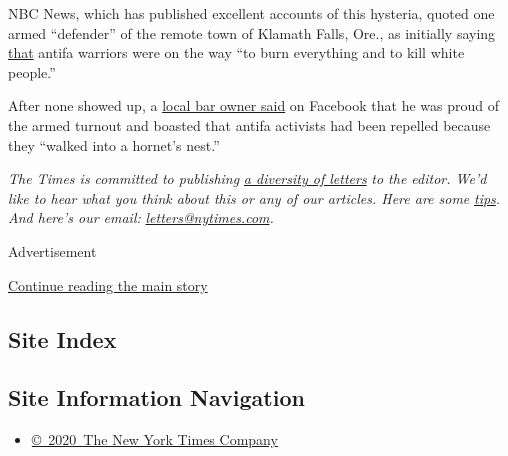 NBC News, which has published excellent accounts of this hysteria,
quoted one armed ``defender'' of the remote town of Klamath Falls, Ore.,
as initially saying
\href{https://www.nbcnews.com/tech/social-media/klamath-falls-oregon-victory-declared-over-antifa-which-never-showed-n1226681}{that}
antifa warriors were on the way ``to burn everything and to kill white
people.''

After none showed up, a
\href{https://www.facebook.com/BlackDogBilliards/posts/3317601008272149?__xts__\%5B0\%5D=68.ARBOw_sLf2jlK3QcCTbMRjrsJTqAsMSxNx2UukVmY45LyqrCuy-X0T0tuAzWSsdnOV4Gl-MnNgR0ecKIxudwgMoBoWWK47arRAtPcgWHMn4AcQPinPKrffW9bsP1FjDhSKqxq01XlrNi3GZxB4SAma4RZkpO3IFOD4MOetuQwe_zJmMJD6Q0G_gmG-4Vd5bRO-AeCt3lRIor1AxDVPKi8ZIkkDH6Px036y_wjw24tJ3p3GrWniT4pLzdM2O3RMBFze1PY5UXn0_wIpDizlYv2MlRIBtEz_gOWzZLCVPtqMqxm5Fb0Vmh4TmbRqd85BahF8uZkTxF2vcXYERo\&__tn__=H-R}{local
bar owner said} on Facebook that he was proud of the armed turnout and
boasted that antifa activists had been repelled because they ``walked
into a hornet's nest.''

\emph{The Times is committed to publishing}
\href{https://www.nytimes.com/2019/01/31/opinion/letters/letters-to-editor-new-york-times-women.html}{\emph{a
diversity of letters}} \emph{to the editor. We'd like to hear what you
think about this or any of our articles. Here are some}
\href{https://help.nytimes.com/hc/en-us/articles/115014925288-How-to-submit-a-letter-to-the-editor}{\emph{tips}}\emph{.
And here's our email:}
\href{mailto:letters@nytimes.com}{\emph{letters@nytimes.com}}\emph{.}

Advertisement

\protect\hyperlink{after-bottom}{Continue reading the main story}

\hypertarget{site-index}{%
\subsection{Site Index}\label{site-index}}

\hypertarget{site-information-navigation}{%
\subsection{Site Information
Navigation}\label{site-information-navigation}}

\begin{itemize}
\tightlist
\item
  \href{https://help.nytimes.com/hc/en-us/articles/115014792127-Copyright-notice}{©~2020~The
  New York Times Company}
\end{itemize}

